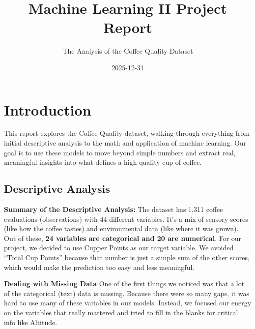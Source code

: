 \documentclass[
]{article}
\title{Machine Learning II Project Report}
\subtitle{The Analysis of the Coffee Quality Dataset}
\author{}
\date{\vspace{-2.5em}2025-12-31}
\begin{document}
\maketitle

{
\setcounter{tocdepth}{2}
\tableofcontents
}
\newpage

\section{Introduction}\label{introduction}

This report explores the Coffee Quality dataset, walking through
everything from initial descriptive analysis to the math and application
of machine learning. Our goal is to use these models to move beyond
simple numbers and extract real, meaningful insights into what defines a
high-quality cup of coffee.

\subsection{Descriptive Analysis}\label{descriptive-analysis}

\textbf{Summary of the Descriptive Analysis:} The dataset has 1,311
coffee evaluations (observations) with 44 different variables. It's a
mix of sensory scores (like how the coffee tastes) and environmental
data (like where it was grown). Out of these, \textbf{24 variables are
categorical and 20 are numerical}. For our project, we decided to use
Cupper Points as our target variable. We avoided ``Total Cup Points''
because that number is just a simple sum of the other scores, which
would make the prediction too easy and less meaningful.

\textbf{Dealing with Missing Data} One of the first things we noticed
was that a lot of the categorical (text) data is missing. Because there
were so many gaps, it was hard to use many of these variables in our
models. Instead, we focused our energy on the variables that really
mattered and tried to fill in the blanks for critical info like
Altitude.
\end{document}
